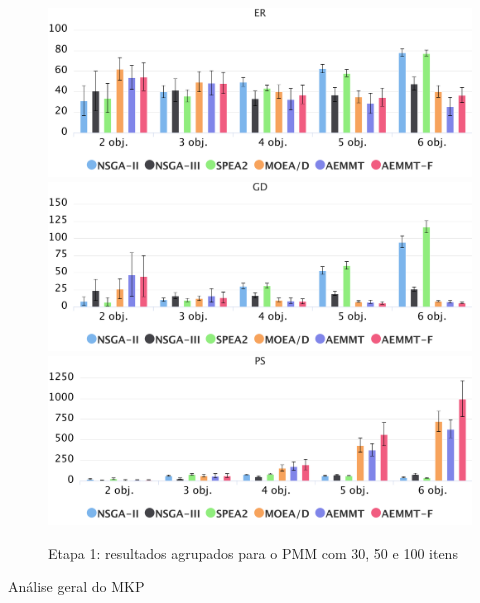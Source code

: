 \begin{figure}[!htbp]
	\caption{Etapa 1: resultados agrupados para o PMM com 30, 50 e 100 itens}
	\label{fig_exp1_mkp_todos}
	\includegraphics[width=1\textwidth]{cap_experimentos/figs/etapa1/er-mkp-todos}
	\includegraphics[width=1\textwidth]{cap_experimentos/figs/etapa1/gd-mkp-todos}
	\includegraphics[width=1\textwidth]{cap_experimentos/figs/etapa1/ps-mkp-todos}
\end{figure}

Análise geral do MKP

